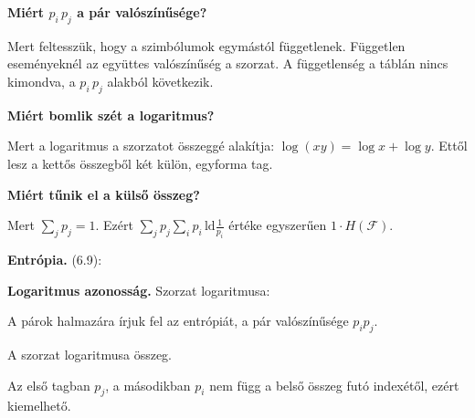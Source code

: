 \begin{elmelet}
\textbf{Miért $p_i\,p_j$ a pár valószínűsége?}\par Mert feltesszük, hogy a szimbólumok egymástól függetlenek. Független eseményeknél az együttes valószínűség a szorzat. A függetlenség a táblán nincs kimondva, a $p_i\,p_j$ alakból következik.

\textbf{Miért bomlik szét a logaritmus?}\par Mert a logaritmus a szorzatot összeggé alakítja: $\log(xy)=\log x+\log y$. Ettől lesz a kettős összegből két külön, egyforma tag.

\textbf{Miért tűnik el a külső összeg?}\par Mert $\sum_j p_j=1$. Ezért $\sum_j p_j \sum_i p_i\,\mathrm{ld}\tfrac1{p_i}$ értéke egyszerűen $1\cdot H(\mathcal F)$.
\end{elmelet}
\begin{elmelet}
\textbf{Entrópia.} (6.9):
\begin{center}\end{center}


\textbf{Logaritmus azonosság.} Szorzat logaritmusa:
\begin{center}\end{center}

\end{elmelet}

A párok halmazára írjuk fel az entrópiát, a pár valószínűsége $p_ip_j$.

\begin{center}\end{center}

A szorzat logaritmusa összeg.

\begin{center}\end{center}

Az első tagban $p_j$, a másodikban $p_i$ nem függ a belső összeg futó indexétől, ezért kiemelhető.

